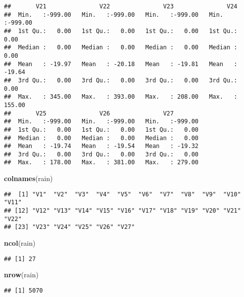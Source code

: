 \documentclass[]{article}
\newenvironment{Shaded}{\begin{snugshade}}{\end{snugshade}}
\newcommand{\KeywordTok}[1]{\textcolor[rgb]{0.13,0.29,0.53}{\textbf{#1}}}
\newcommand{\NormalTok}[1]{#1}
\begin{document}
\begin{verbatim}
##       V21               V22               V23               V24         
##  Min.   :-999.00   Min.   :-999.00   Min.   :-999.00   Min.   :-999.00  
##  1st Qu.:   0.00   1st Qu.:   0.00   1st Qu.:   0.00   1st Qu.:   0.00  
##  Median :   0.00   Median :   0.00   Median :   0.00   Median :   0.00  
##  Mean   : -19.97   Mean   : -20.18   Mean   : -19.81   Mean   : -19.64  
##  3rd Qu.:   0.00   3rd Qu.:   0.00   3rd Qu.:   0.00   3rd Qu.:   0.00  
##  Max.   : 345.00   Max.   : 393.00   Max.   : 208.00   Max.   : 155.00  
##       V25               V26               V27         
##  Min.   :-999.00   Min.   :-999.00   Min.   :-999.00  
##  1st Qu.:   0.00   1st Qu.:   0.00   1st Qu.:   0.00  
##  Median :   0.00   Median :   0.00   Median :   0.00  
##  Mean   : -19.74   Mean   : -19.54   Mean   : -19.32  
##  3rd Qu.:   0.00   3rd Qu.:   0.00   3rd Qu.:   0.00  
##  Max.   : 178.00   Max.   : 381.00   Max.   : 279.00
\end{verbatim}

\begin{Shaded}
\begin{Highlighting}[]
\KeywordTok{colnames}\NormalTok{(rain)}
\end{Highlighting}
\end{Shaded}

\begin{verbatim}
##  [1] "V1"  "V2"  "V3"  "V4"  "V5"  "V6"  "V7"  "V8"  "V9"  "V10" "V11"
## [12] "V12" "V13" "V14" "V15" "V16" "V17" "V18" "V19" "V20" "V21" "V22"
## [23] "V23" "V24" "V25" "V26" "V27"
\end{verbatim}

\begin{Shaded}
\begin{Highlighting}[]
\KeywordTok{ncol}\NormalTok{(rain)}
\end{Highlighting}
\end{Shaded}

\begin{verbatim}
## [1] 27
\end{verbatim}

\begin{Shaded}
\begin{Highlighting}[]
\KeywordTok{nrow}\NormalTok{(rain)}
\end{Highlighting}
\end{Shaded}

\begin{verbatim}
## [1] 5070
\end{verbatim}
\end{document}
